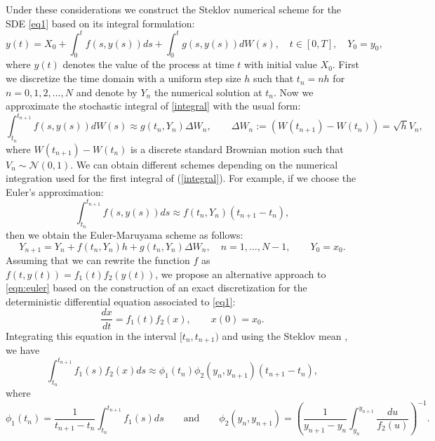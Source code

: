 
	Under these considerations we construct the Steklov numerical scheme for the SDE
	\eqref{eq1} based on its  integral formulation:
	\begin{equation}\label{integral} y(t)= X_0+\int_0^t 
		f(s,y(s)) ds+ \int_0^t 
		g(s,y(s)) dW(s),   \quad t\in[0,T], \quad Y_0=y_0,
	\end{equation} 
	where $y(t)$  denotes the value of the process at time $t$ with initial value  $X_0$.
	First we discretize the time domain with a uniform  step size $h$ such that $t_n=nh$
	for $n=0,1,2,\dots,N$ and denote by $Y_n$  the numerical solution at $t_n$. Now we
	approximate the stochastic integral of \eqref{integral} with the usual form:
	\begin{equation}\label{discret} 
		\int_{t_n}^{t_{n+1}}f(s,y(s)) dW(s)\approx g(t_n,Y_n)\Delta W_n, \qquad
		\Delta W_n:=(W(t_{n+1})-W(t_n))=\sqrt{h} V_n,
	\end{equation} 
	where $W(t_{n+1})-W(t_n)$ is a discrete standard Brownian motion such that $V_n\sim
	\mathcal{N}(0,1)$. We can obtain different schemes depending on the numerical
	integration used for the first integral of (\ref{integral}). For example, if we choose
	the Euler's approximation:  
	\begin{equation}\label{eqn:euler} 
		\int_{t_n}^{t_{n+1}} f(s, y(s))ds\approx 
		f(t_n,Y_n)(t_{n+1}-t_n), 
	\end{equation} 
		then we obtain the Euler-Maruyama scheme as follows:
	\begin{equation}\label{EM} 
		Y_{n+1}=Y_n + f(t_n,Y_n)h + g(t_n,Y_n)\Delta W_n, 
		\quad n=1,\dots,N-1, \qquad Y_0=x_0. 
	\end{equation} 
	Assuming that we can rewrite the function $f$ as $f(t,y(t))=f_1(t)f_2(y(t))$, we
	propose  an alternative approach to \eqref{eqn:euler} based on the construction of an
	exact  discretization for the deterministic  differential equation associated to
	\eqref{eq1}:
	\begin{equation}\label{eqn:DeterODE}
		\frac{dx}{dt}=f_1(t)f_2(x), \qquad x(0)=x_0.
	\end{equation}
	Integrating this equation in the interval $[t_n,t_{n+1})$ and 
	using the Steklov mean  \cite{Matus2005}, we have
	\begin{equation}\label{stek1}
		\int_{t_n}^{t_{n+1}} f_1(s)f_2(x)ds \approx
		\phi_1(t_n)\phi_2(y_n,y_{n+1})(t_{n+1}-t_n),
	\end{equation}
		where
		\begin{equation*}
			\phi_1(t_n)=\frac{1}{t_{n+1}-t_n}\int_{t_n}^{t_{n+1}} f_1(s)ds\qquad 
			\mbox{and} \qquad
			\phi_2(y_n,y_{n+1})=\left(\frac{1}{y_{n+1}-y_{n}} 
			\int_{y_n}^{y_{n+1}} 
			\frac{du}{f_2(u)} 
			\right)^{-1}. 
	\end{equation*}
